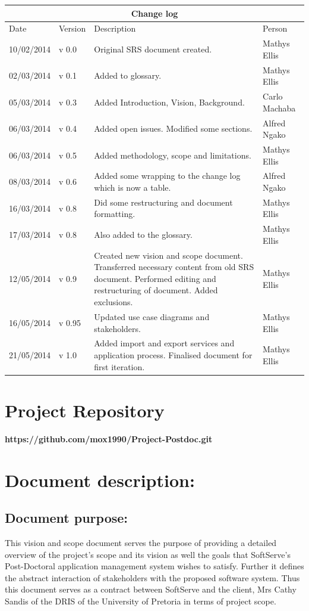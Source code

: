 \documentclass[12pt]{article}
\newcommand{\repo}{https://github.com/mox1990/Project-Postdoc.git}
\begin{document}
\begin{center}
\begin{tabular}{|l|p{1.4cm}|p{8cm}|p{2.8cm}|}
\hline
\multicolumn{4}{|c|}{\bf Change log} \\
\hline
 Date & Version & Description &  Person \\
\hline
10/02/2014 & v 0.0 & Original SRS document created. & Mathys Ellis \\
\hline
02/03/2014 & v 0.1 & Added to glossary. & Mathys Ellis \\
\hline
05/03/2014 & v 0.3 & Added Introduction, Vision, Background. & Carlo Machaba \\
\hline
06/03/2014 & v 0.4 & Added open issues. Modified some sections. & Alfred Ngako \\
\hline
06/03/2014 & v 0.5 & Added methodology, scope and limitations. & Mathys Ellis \\
\hline
08/03/2014 & v 0.6 & Added some wrapping to the change log which is now a table. & Alfred Ngako \\
\hline
16/03/2014 & v 0.8 & Did some restructuring and document formatting. & Mathys Ellis \\
\hline
17/03/2014 & v 0.8 & Also added to the glossary. & Mathys Ellis \\
\hline
12/05/2014 & v 0.9 & Created new vision and scope document. Transferred necessary content from old SRS document. Performed editing and restructuring of document. Added exclusions. & Mathys Ellis \\
\hline
16/05/2014 & v 0.95 & Updated use case diagrams and stakeholders. & Mathys Ellis \\
\hline
21/05/2014 & v 1.0 & Added import and export services and application process. Finalised document for first iteration. & Mathys Ellis \\
\hline

\end{tabular}
\end{center}
\newpage
\tableofcontents

\listoffigures
\newpage
\section{Project Repository}
\textbf{\repo}
\newpage
\section{Document description:}

\subsection{Document purpose:}
\vspace{0.2in}
This vision and scope document serves the purpose of providing a detailed overview of the project's scope and its vision as well the goals that SoftServe's Post-Doctoral application management system wishes to satisfy. Further it defines the abstract interaction of stakeholders with the proposed software system. Thus this document serves as a contract between SoftServe and the client, Mrs Cathy Sandis of the DRIS of the University of Pretoria in terms of project scope.
\end{document}
